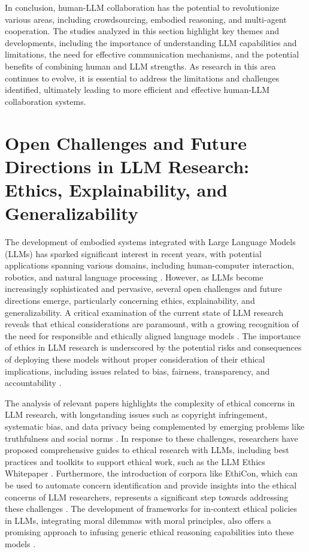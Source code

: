 \documentclass[conference]{IEEEtran}
\begin{document}
In conclusion, human-LLM collaboration has the potential to revolutionize various areas, including crowdsourcing, embodied reasoning, and multi-agent cooperation. The studies analyzed in this section highlight key themes and developments, including the importance of understanding LLM capabilities and limitations, the need for effective communication mechanisms, and the potential benefits of combining human and LLM strengths. As research in this area continues to evolve, it is essential to address the limitations and challenges identified, ultimately leading to more efficient and effective human-LLM collaboration systems.

\section{Open Challenges and Future Directions in LLM Research: Ethics, Explainability, and Generalizability}
The development of embodied systems integrated with Large Language Models (LLMs) has sparked significant interest in recent years, with potential applications spanning various domains, including human-computer interaction, robotics, and natural language processing \cite{b1}. However, as LLMs become increasingly sophisticated and pervasive, several open challenges and future directions emerge, particularly concerning ethics, explainability, and generalizability. A critical examination of the current state of LLM research reveals that ethical considerations are paramount, with a growing recognition of the need for responsible and ethically aligned language models \cite{b2}. The importance of ethics in LLM research is underscored by the potential risks and consequences of deploying these models without proper consideration of their ethical implications, including issues related to bias, fairness, transparency, and accountability \cite{b3}.

The analysis of relevant papers highlights the complexity of ethical concerns in LLM research, with longstanding issues such as copyright infringement, systematic bias, and data privacy being complemented by emerging problems like truthfulness and social norms \cite{b4}. In response to these challenges, researchers have proposed comprehensive guides to ethical research with LLMs, including best practices and toolkits to support ethical work, such as the LLM Ethics Whitepaper \cite{b5}. Furthermore, the introduction of corpora like EthiCon, which can be used to automate concern identification and provide insights into the ethical concerns of LLM researchers, represents a significant step towards addressing these challenges \cite{b6}. The development of frameworks for in-context ethical policies in LLMs, integrating moral dilemmas with moral principles, also offers a promising approach to infusing generic ethical reasoning capabilities into these models \cite{b7}.
\end{document}
